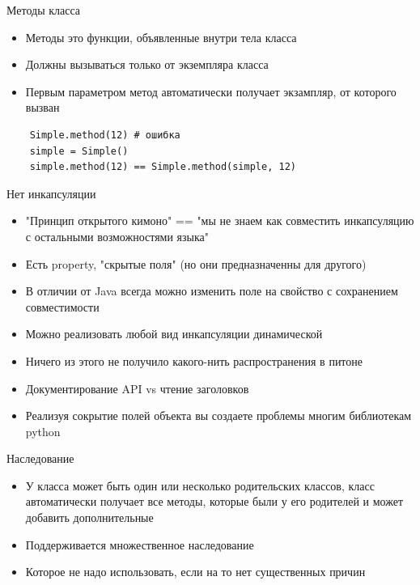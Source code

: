 \documentclass{article}
\begin{document}
\begin{center} Методы класса\end{center}
\begin{itemize}
    \item Методы это функции, объявленные внутри тела класса
    \item Должны вызываться только от экземпляра класса
    \item Первым параметром метод автоматически получает экзампляр, от которого вызван
\end{itemize}

\begin{lstlisting}
    Simple.method(12) # ошибка
    simple = Simple()
    simple.method(12) == Simple.method(simple, 12)
\end{lstlisting}
\newpage

\begin{center} Нет инкапсуляции \end{center}
\begin{itemize}
    \item "Принцип открытого кимоно" == 
        "мы не знаем как совместить инкапсуляцию 
        с остальными возможностями языка"
    \item Есть property, "скрытые поля" (но они предназначенны для другого)
    \item В отличии от Java всегда можно изменить поле на свойство 
            с сохранением совместимости
    \item Можно реализовать любой вид инкапсуляции динамической
    \item Ничего из этого не получило какого-нить распространения в питоне
    \item Документирование API vs чтение заголовков
    \item Реализуя сокрытие полей объекта вы 
        создаете проблемы многим библиотекам python
\end{itemize}
\newpage

\begin{center} Наследование \end{center}
\begin{itemize}
    \item У класса может быть один или несколько родительских классов, 
          класс автоматически получает все методы, которые были у его родителей
          и может добавить дополнительные
    \item Поддерживается множественное наследование
    \item Которое не надо использовать, если на то нет существенных причин
\end{itemize}
\end{document}
